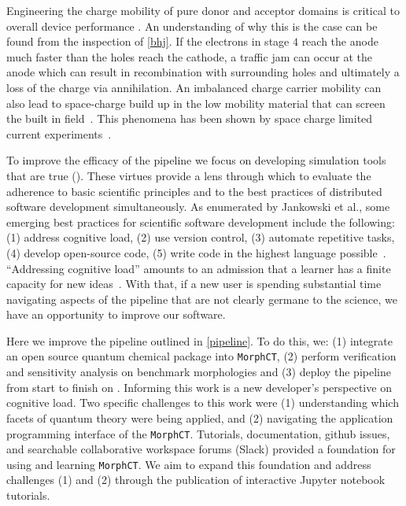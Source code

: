 
Engineering the charge mobility of pure donor and acceptor domains is critical
to overall device performance \cite{Wang2019e}.
An understanding of why this is the case can be found from the inspection of \autoref{bhj}.
If the electrons in stage $4$ reach the anode much faster than the holes reach the cathode, a traffic jam can
occur at the anode which can result in recombination with surrounding holes and ultimately a loss of the
charge via annihilation. 
An imbalanced charge carrier mobility can also lead to space-charge build up in the 
low mobility material that can screen the built in field~\cite{Bartelt2015}.
This phenomena has been shown by space charge limited current experiments~\cite{Small2013}.

To improve the efficacy of the pipeline we focus on
developing simulation tools that are
\gls{true} (\cite{Cummings2017}).
These virtues provide a lens through which to %
evaluate the adherence to basic scientific principles and to the best practices of distributed software development
simultaneously. As enumerated by Jankowski et al., some emerging best practices for scientific software
development include the following: (1) address cognitive load, (2) use version control, (3) automate %
repetitive tasks, (4) develop open-source code, (5) write code in the highest language possible~\cite{Jankowski2020}.
``Addressing cognitive load'' amounts to an admission that a learner has a
finite capacity for new ideas~\cite{Jankowski2019}. With that, if a new user is spending
substantial time navigating aspects of the pipeline that are not clearly
germane to the science, we have an opportunity to improve our software.

Here we improve the pipeline outlined in \autoref{pipeline}.
To do this, we: (1) integrate an open source quantum chemical package into \texttt{MorphCT},
(2) perform verification and sensitivity analysis on benchmark 
morphologies and
(3) deploy the pipeline from start to finish on . 
Informing this work is a new developer's perspective on cognitive load. 
Two specific challenges to this work were (1) understanding which facets of quantum
theory were being applied, and (2) navigating the application programming
interface of the \texttt{MorphCT}.
Tutorials, documentation, github issues, and searchable collaborative workspace
forums (Slack) provided a foundation for using and learning \texttt{MorphCT}.
We aim to expand this foundation and address challenges (1) and (2) through
the publication of interactive Jupyter notebook tutorials.

